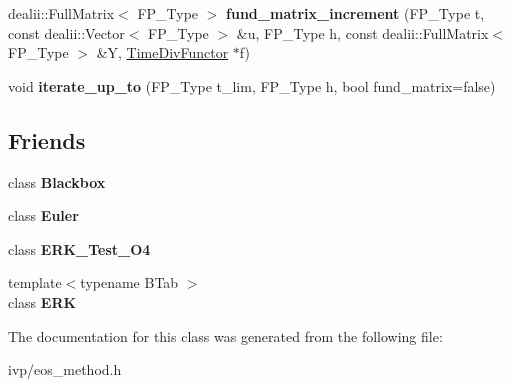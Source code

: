 \begin{DoxyCompactItemize}
\item 
\mbox{\label{classEOS__Method_a517941a279977b5093cd7a422bc12d7d}} 
dealii\+::\+Full\+Matrix$<$ F\+P\+\_\+\+Type $>$ {\bfseries fund\+\_\+matrix\+\_\+increment} (F\+P\+\_\+\+Type t, const dealii\+::\+Vector$<$ F\+P\+\_\+\+Type $>$ \&u, F\+P\+\_\+\+Type h, const dealii\+::\+Full\+Matrix$<$ F\+P\+\_\+\+Type $>$ \&Y, \hyperlink{classTimeDivFunctor}{Time\+Div\+Functor} $\ast$f)
\item 
\mbox{\label{classEOS__Method_a92ed100b4b154a7adb3a37b6e078b3ce}} 
void {\bfseries iterate\+\_\+up\+\_\+to} (F\+P\+\_\+\+Type t\+\_\+lim, F\+P\+\_\+\+Type h, bool fund\+\_\+matrix=false)
\end{DoxyCompactItemize}
\subsection*{Friends}
\begin{DoxyCompactItemize}
\item 
\mbox{\label{classEOS__Method_af3aa570b8e278b935d7dc84d2774ccb7}} 
class {\bfseries Blackbox}
\item 
\mbox{\label{classEOS__Method_a9e8c94ebada889fba517c82fc3408d32}} 
class {\bfseries Euler}
\item 
\mbox{\label{classEOS__Method_aaaa2b514e0ee583889d7f78273370f56}} 
class {\bfseries E\+R\+K\+\_\+\+Test\+\_\+\+O4}
\item 
\mbox{\label{classEOS__Method_a55adbdc4c0fea0e770e4d18b0379d490}} 
{\footnotesize template$<$typename B\+Tab $>$ }\\class {\bfseries E\+RK}
\end{DoxyCompactItemize}


The documentation for this class was generated from the following file\+:\begin{DoxyCompactItemize}
\item 
ivp/eos\+\_\+method.\+h\end{DoxyCompactItemize}
